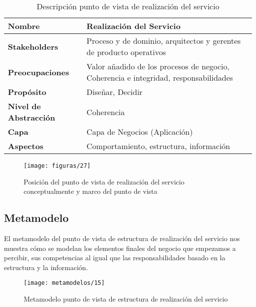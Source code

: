     \begin{table}[H]
    	\centering
    	\begin{tabular}{p{3.7cm}p{8cm}}
    		\hline
    		\rowcolor[HTML]{0073a1}
    		{\color[HTML]{FFFFFF} \textbf{Nombre}} & {\color[HTML]{FFFFFF} \textbf{Realización del Servicio}} \\
    		\hline
    		\textbf{Stakeholders} & Proceso y de dominio, arquitectos y gerentes de producto operativos \\
    		\textbf{Preocupaciones} & Valor añadido de los procesos de negocio, Coherencia e integridad,
    		responsabilidades \\
    		\textbf{Propósito} & Diseñar, Decidir \\
    		\textbf{Nivel de Abstracción} & Coherencia \\
    		\textbf{Capa} & Capa de Negocios (Aplicación) \\
    		\textbf{Aspectos} & Comportamiento, estructura, información \\
    		\bottomrule
    	\end{tabular}
    	\captionsetup{width=.95\textwidth}
    	\caption{Descripción punto de vista de realización del servicio}
    	\label{tabla18}
    \end{table}
    
    \begin{figure}[H]
    	\centering
    	\texttt{[image: figuras/27]}
    	\captionsetup{width=.95\textwidth}
    	\caption{Posición del punto de vista de realización del servicio conceptualmente y marco del punto de vista}
    	\label{figura27}
    \end{figure}
    
    \subsection{Metamodelo}
    El metamodelo del punto de vista de estructura de realización del servicio nos muestra cómo se modelan los elementos finales del negocio que empezamos a percibir, sus competencias al igual que las responsabilidades basado en la estructura y la información.
    
    \begin{figure}[H]
    	\centering
    	\texttt{[image: metamodelos/15]}
    	\captionsetup{width=.95\textwidth}
    	\caption{Metamodelo punto de vista de estructura de realización del servicio}
    	\label{metamodelo15}
    \end{figure}
    
